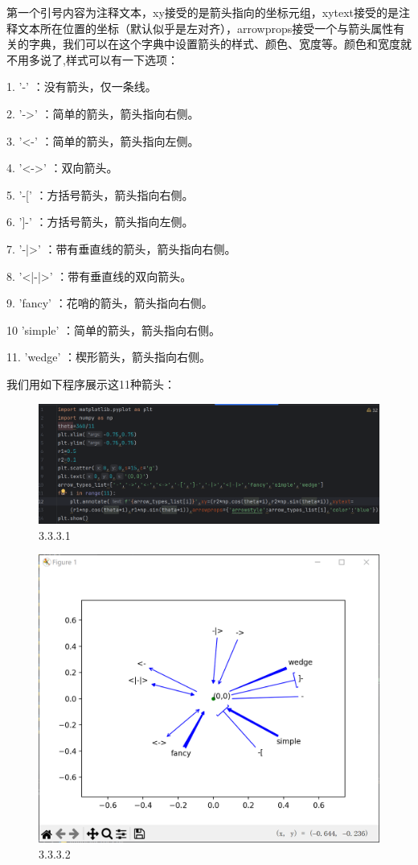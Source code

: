 \documentclass[12pt]{article}
\begin{document}
第一个引号内容为注释文本，xy接受的是箭头指向的坐标元组，xytext接受的是注释文本所在位置的坐标（默认似乎是左对齐），arrowprops接受一个与箭头属性有关的字典，我们可以在这个字典中设置箭头的样式、颜色、宽度等。颜色和宽度就不用多说了,样式可以有一下选项：

1. '-'  ：没有箭头，仅一条线。

2.   '->'  ：简单的箭头，箭头指向右侧。

3.   '<-'  ：简单的箭头，箭头指向左侧。

4.   '<->'  ：双向箭头。

5.   '-['  ：方括号箭头，箭头指向右侧。

6.   ']-'  ：方括号箭头，箭头指向左侧。

7.   '-|>'  ：带有垂直线的箭头，箭头指向右侧。

8.   '<|-|>'  ：带有垂直线的双向箭头。

9.   'fancy'  ：花哨的箭头，箭头指向右侧。

10   'simple'  ：简单的箭头，箭头指向右侧。

11.   'wedge'  ：楔形箭头，箭头指向右侧。

我们用如下程序展示这11种箭头：
\begin{figure}[H]
    \centering
    \includegraphics[width=1\linewidth]{annotate program1.png}
    \caption{3.3.3.1}
    \label{fig:enter-label}
\end{figure}

\begin{figure}[H]
    \centering
    \includegraphics[width=0.6\linewidth]{annotate Pic1.png}
    \caption{3.3.3.2}
    \label{fig:enter-label}
\end{figure}
\end{document}
